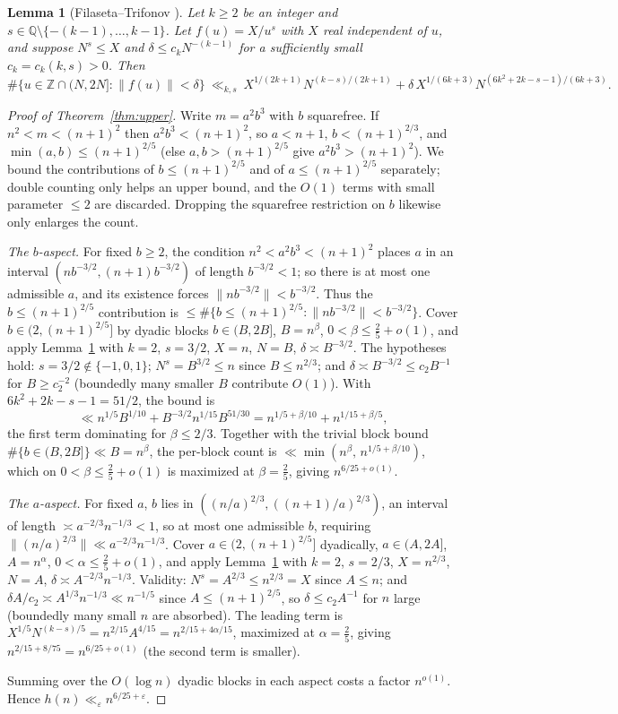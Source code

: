 \documentclass[11pt]{article}
\newtheorem{lemma}{Lemma}
\theoremstyle{definition}
\newcommand{\Z}{\mathbb{Z}}
\newcommand{\Q}{\mathbb{Q}}
\newcommand{\norm}[1]{\lVert #1 \rVert}
\begin{document}
\begin{lemma}[Filaseta--Trifonov {\cite[Theorem~7]{FT96}}]\label{lem:ft}
Let $k\ge2$ be an integer and $s\in\Q\setminus\{-(k-1),\dots,k-1\}$. Let $f(u)=X/u^s$ with $X$ real
independent of $u$, and suppose $N^s\le X$ and $\delta\le c_k N^{-(k-1)}$ for a sufficiently small
$c_k=c_k(k,s)>0$. Then
\[
 \#\{u\in\Z\cap(N,2N]:\norm{f(u)}<\delta\}\ \ll_{k,s}\ X^{1/(2k+1)}N^{(k-s)/(2k+1)}+\delta\,X^{1/(6k+3)}N^{(6k^2+2k-s-1)/(6k+3)}.
\]
\end{lemma}

\begin{proof}[Proof of Theorem~\ref{thm:upper}]
Write $m=a^2b^3$ with $b$ squarefree. If $n^2<m<(n+1)^2$ then $a^2b^3<(n+1)^2$, so $a<n+1$,
$b<(n+1)^{2/3}$, and $\min(a,b)\le(n+1)^{2/5}$ (else $a,b>(n+1)^{2/5}$ give $a^2b^3>(n+1)^2$). We bound the
contributions of $b\le(n+1)^{2/5}$ and of $a\le(n+1)^{2/5}$ separately; double counting only helps an upper
bound, and the $O(1)$ terms with small parameter $\le2$ are discarded. Dropping the squarefree restriction on
$b$ likewise only enlarges the count.

\emph{The $b$-aspect.} For fixed $b\ge2$, the condition $n^2<a^2b^3<(n+1)^2$ places $a$ in an interval
$(nb^{-3/2},(n+1)b^{-3/2})$ of length $b^{-3/2}<1$; so there is at most one admissible $a$, and its existence
forces $\norm{nb^{-3/2}}<b^{-3/2}$. Thus the $b\le(n+1)^{2/5}$ contribution is
$\le\#\{b\le(n+1)^{2/5}:\norm{nb^{-3/2}}<b^{-3/2}\}$. Cover $b\in(2,(n+1)^{2/5}]$ by dyadic blocks
$b\in(B,2B]$, $B=n^\beta$, $0<\beta\le\tfrac25+o(1)$, and apply Lemma~\ref{lem:ft} with $k=2$, $s=3/2$, $X=n$,
$N=B$, $\delta\asymp B^{-3/2}$. The hypotheses hold: $s=3/2\notin\{-1,0,1\}$; $N^s=B^{3/2}\le n$ since
$B\le n^{2/3}$; and $\delta\asymp B^{-3/2}\le c_2B^{-1}$ for $B\ge c_2^{-2}$ (boundedly many smaller $B$
contribute $O(1)$). With $6k^2+2k-s-1=51/2$, the bound is
\[
  \ll n^{1/5}B^{1/10}+B^{-3/2}n^{1/15}B^{51/30}=n^{1/5+\beta/10}+n^{1/15+\beta/5},
\]
the first term dominating for $\beta\le2/3$. Together with the trivial block bound $\#\{b\in(B,2B]\}\ll B=n^\beta$,
the per-block count is $\ll\min(n^\beta,\,n^{1/5+\beta/10})$, which on $0<\beta\le\tfrac25+o(1)$ is maximized at
$\beta=\tfrac25$, giving $n^{6/25+o(1)}$.

\emph{The $a$-aspect.} For fixed $a$, $b$ lies in $((n/a)^{2/3},((n+1)/a)^{2/3})$, an interval of length
$\asymp a^{-2/3}n^{-1/3}<1$, so at most one admissible $b$, requiring $\norm{(n/a)^{2/3}}\ll a^{-2/3}n^{-1/3}$.
Cover $a\in(2,(n+1)^{2/5}]$ dyadically, $a\in(A,2A]$, $A=n^\alpha$, $0<\alpha\le\tfrac25+o(1)$, and apply
Lemma~\ref{lem:ft} with $k=2$, $s=2/3$, $X=n^{2/3}$, $N=A$, $\delta\asymp A^{-2/3}n^{-1/3}$. Validity:
$N^s=A^{2/3}\le n^{2/3}=X$ since $A\le n$; and $\delta A/c_2\asymp A^{1/3}n^{-1/3}\ll n^{-1/5}$ since
$A\le(n+1)^{2/5}$, so $\delta\le c_2A^{-1}$ for $n$ large (boundedly many small $n$ are absorbed). The leading
term is $X^{1/5}N^{(k-s)/5}=n^{2/15}A^{4/15}=n^{2/15+4\alpha/15}$, maximized at $\alpha=\tfrac25$, giving
$n^{2/15+8/75}=n^{6/25+o(1)}$ (the second term is smaller).

Summing over the $O(\log n)$ dyadic blocks in each aspect costs a factor $n^{o(1)}$. Hence
$h(n)\ll_\varepsilon n^{6/25+\varepsilon}$.
\end{proof}
\end{document}
